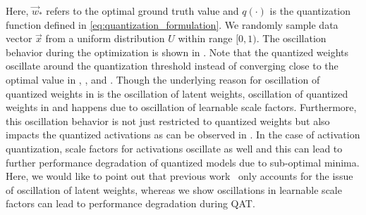Here, $\vec{w}_*$ refers to the optimal ground truth value and $q(\cdot)$ is the quantization function defined in \eqref{eq:quantization_formulation}. We randomly sample data vector $\vec{x}$ from a uniform distribution $U$ within range $[0,1)$. The oscillation behavior during the optimization is shown in . Note that the quantized weights oscillate around the quantization threshold instead of converging close to the optimal value in , , and . Though the underlying reason for oscillation of quantized weights in  is the oscillation of latent weights, oscillation of quantized weights in  and  happens due to oscillation of learnable scale factors. Furthermore, this oscillation behavior is not just restricted to quantized weights but also impacts the quantized activations as can be observed in . In the case of activation quantization, scale factors for activations oscillate as well and this can lead to further performance degradation of quantized models due to sub-optimal minima. Here, we would like to point out that previous work~\cite{nagel2022overcoming} only accounts for the issue of oscillation of latent weights, whereas we show oscillations in learnable scale factors can lead to performance degradation during \acrshort{QAT}.


